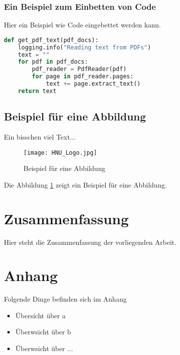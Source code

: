 \documentclass[12pt, a4paper, twoside]{article} %
\begin{document}
\subsubsection{Ein Beispiel zum Einbetten von Code}
Hier ein Beispiel wie Code eingebettet werden kann.

\begin{lstlisting}[language=Python, caption=Beispiel für Python-Code]
    def get_pdf_text(pdf_docs):
    logging.info("Reading text from PDFs")
    text = ""
    for pdf in pdf_docs:
        pdf_reader = PdfReader(pdf)
        for page in pdf_reader.pages:
            text += page.extract_text()
    return text
\end{lstlisting}

\subsection{Beispiel für eine Abbildung}
Ein bisschen viel Text... \lipsum[1] 

\begin{figure}[h!]
\centering
\texttt{[image: HNU\_Logo.jpg]}
\caption{Beispiel für eine Abbildung}
\label{fig:beispiel}
\end{figure}
Die Abbildung \ref{fig:beispiel} zeigt ein Beispiel für eine Abbildung. \lipsum[1]


\newpage 
\section{Zusammenfassung}
Hier steht die Zusammenfassung der vorliegenden Arbeit.


\newpage
\printbibliography %


\newpage
\section{Anhang}
Folgende Dinge befinden sich im Anhang
\begin{itemize}
    \item Übersicht über a
    \item Überwsicht über b
    \item Überwsicht über ...
\end{itemize}
\end{document}
